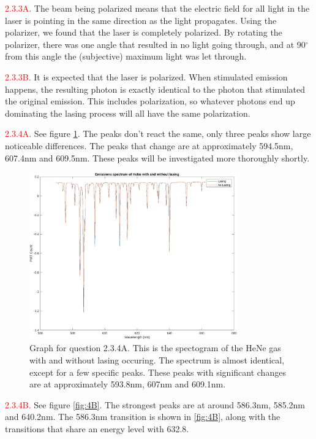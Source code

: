 \documentclass[letterpaper, reqno,11pt]{article}
\begin{document}
\noindent \textcolor{red}{2.3.3A.} The beam being polarized means that the electric field for all light in the laser is pointing in the same direction as the light propagates. Using the polarizer, we found that the laser is completely polarized. By rotating the polarizer, there was one angle that resulted in no light going through, and at 90$^{\circ}$ from this angle the (subjective) maximum light was let through.

\noindent \textcolor{red}{2.3.3B.} It is expected that the laser is polarized. When stimulated emission happens, the resulting photon is exactly identical to the photon that stimulated the original emission. This includes polarization, so whatever photons end up dominating the lasing process will all have the same polarization.

\noindent \textcolor{red}{2.3.4A.} See figure \ref{fig:4A}. The peaks don't react the same, only three peaks show large noticeable differences. The peaks that change are at approximately 594.5nm, 607.4nm and 609.5nm. These peaks will be investigated more thoroughly shortly.

\begin{figure}[tb]
    \centering
    \includegraphics[width=0.8\textwidth]{4A}
    \caption{Graph for question 2.3.4A. This is the spectogram of the HeNe gas with and without lasing occuring. The spectrum is almost identical, except for a few specific peaks. These peaks with significant changes are at approximately 593.8nm, 607nm and 609.1nm.}
    \label{fig:4A}
\end{figure}

\noindent \textcolor{red}{2.3.4B.} See figure \ref{fig:4B}. The strongest peaks are at around 586.3nm, 585.2nm and 640.2nm. The 586.3nm transition is shown in \ref{fig:4B}, along with the transitions that share an energy level with 632.8.
\end{document}

